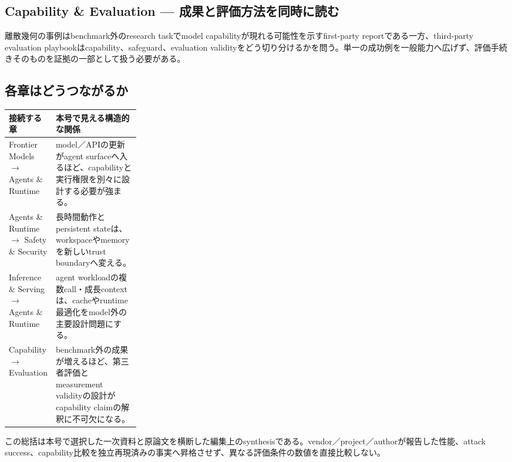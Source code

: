 \begin{multicols}{2}
\subsection{Capability \& Evaluation — 成果と評価方法を同時に読む}
離散幾何の事例はbenchmark外のresearch taskでmodel capabilityが現れる可能性を示すfirst-party reportである一方、third-party evaluation playbookはcapability、safeguard、evaluation validityをどう切り分けるかを問う。単一の成功例を一般能力へ広げず、評価手続きそのものを証拠の一部として扱う必要がある。 \cite{src-1c93d6c1c725,src-8c84b8422093,src-24add4f36a45}

\end{multicols}
\Needspace{0.34\textheight}
\subsection*{各章はどうつながるか}
\begin{center}
\small
\renewcommand{\arraystretch}{1.16}
\begin{tabularx}{\linewidth}{@{}p{0.26\linewidth}X@{}}
\toprule
接続する章 & 本号で見える構造的な関係 \\
\midrule
Frontier Models $\rightarrow$ Agents \& Runtime & model／APIの更新がagent surfaceへ入るほど、capabilityと実行権限を別々に設計する必要が強まる。 \cite{src-a24fd97eb3d0,src-66be12207714} \\
Agents \& Runtime $\rightarrow$ Safety \& Security & 長時間動作とpersistent stateは、workspaceやmemoryを新しいtrust boundaryへ変える。 \cite{src-4a3442a5ca8c,src-f216d6cd7707} \\
Inference \& Serving $\rightarrow$ Agents \& Runtime & agent workloadの複数call・成長contextは、cacheやruntime最適化をmodel外の主要設計問題にする。 \cite{src-ac04c00cf21f,src-77e29e3fac8f,src-c97320147e8c,src-80b8d67933c0} \\
Capability $\rightarrow$ Evaluation & benchmark外の成果が増えるほど、第三者評価とmeasurement validityの設計がcapability claimの解釈に不可欠になる。 \cite{src-1c93d6c1c725,src-8c84b8422093,src-24add4f36a45} \\
\bottomrule
\end{tabularx}
\renewcommand{\arraystretch}{1.0}
\end{center}
\normalsize
\begin{claimboundary}[この総括の境界]
この総括は本号で選択した一次資料と原論文を横断した編集上のsynthesisである。vendor／project／authorが報告した性能、attack success、capability比較を独立再現済みの事実へ昇格させず、異なる評価条件の数値を直接比較しない。
\end{claimboundary}
